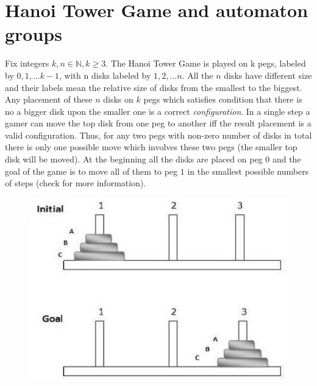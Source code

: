 \documentclass[a4paper,12pt]{amsart}
\begin{document}
\section{Hanoi Tower Game and automaton groups}

Fix integers $k, n \in \mathbb{N}, k \ge 3$. The Hanoi Tower Game is played on k pegs, labeled by
$0, 1, ... k-1$, with n disks labeled by $1, 2, ... n$. All the $n$ disks have different
size and their labels mean the relative size of disks from the smallest to the biggest.
Any placement of these $n$ disks on $k$ pegs which satisfies condition that there is no
a bigger disk upon the smaller one is a correct \textit{configuration}. In a single step
a gamer can move the top disk from one peg to another iff the result placement is a valid configuration.
Thus, for any two pegs with non-zero number of disks in total there is only one possible move which
involves these two pegs (the smaller top disk will be moved). At the beginning all the disks are placed
on peg $0$ and the goal of the game is to move all of them to peg $1$ in the smallest possible numbers of
steps (check \cite{HaoniDesk} for more information).

\begin{figure}[h]
	\includegraphics[scale=0.4]{../graphs/hanoi_tower.jpg}
	\centering
\end{figure}
\end{document}
